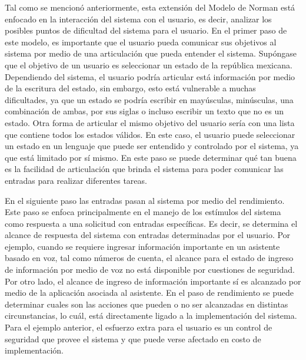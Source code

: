 Tal como se mencionó anteriormente, esta extensión del Modelo de Norman está enfocado en la interacción del sistema con el usuario, es decir, analizar los posibles puntos de dificultad del sistema para el usuario. En el primer paso de este modelo, es importante que el usuario pueda comunicar sus objetivos al sistema por medio de una articulación que pueda entender el sistema. Supóngase que el objetivo de un usuario es seleccionar un estado de la república mexicana. Dependiendo del sistema, el usuario podría articular está información por medio de la escritura del estado, sin embargo, esto está vulnerable a muchas dificultades, ya que un estado se podría escribir en mayúsculas, minúsculas, una combinación de ambas, por sus siglas o incluso escribir un texto que no es un estado. Otra forma de articular el mismo objetivo del usuario sería con una lista que contiene todos los estados válidos. En este caso, el usuario puede seleccionar un estado en un lenguaje que puede ser entendido y controlado por el sistema, ya que está limitado por sí mismo. En este paso se puede determinar qué tan buena es la facilidad de articulación que brinda el sistema para poder comunicar las entradas para realizar diferentes tareas.

En el siguiente paso las entradas pasan al sistema por medio del rendimiento. Este paso se enfoca principalmente en el manejo de los estímulos del sistema como respuesta a una solicitud con entradas específicas. Es decir, se determina el alcance de respuesta del sistema con entradas determinadas por el usuario. Por ejemplo, cuando se requiere ingresar información importante en un asistente basado en voz, tal como números de cuenta, el alcance para el estado de ingreso de información por medio de voz no está disponible por cuestiones de seguridad. Por otro lado, el alcance de ingreso de información importante sí es alcanzado por medio de la aplicación asociada al asistente. En el paso de rendimiento se puede determinar cuales son las acciones que pueden o no ser alcanzadas en distintas circunstancias, lo cuál, está directamente ligado a la implementación del sistema. Para el ejemplo anterior, el esfuerzo extra para el usuario es un control de seguridad que provee el sistema y que puede verse afectado en costo de implementación.

